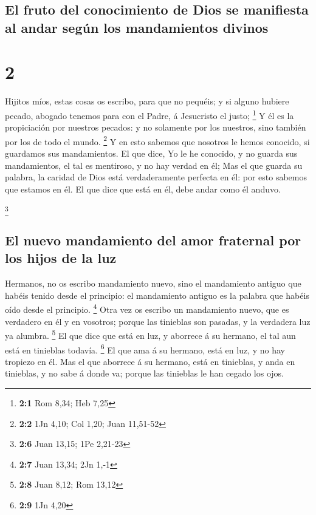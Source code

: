 \hypertarget{el-fruto-del-conocimiento-de-dios-se-manifiesta-al-andar-seguxfan-los-mandamientos-divinos}{%
\subsection{El fruto del conocimiento de Dios se manifiesta al andar
según los mandamientos
divinos}\label{el-fruto-del-conocimiento-de-dios-se-manifiesta-al-andar-seguxfan-los-mandamientos-divinos}}

\hypertarget{section-1}{%
\section{2}\label{section-1}}

 Hijitos míos, estas cosas os escribo, para que no pequéis;
y si alguno hubiere pecado, abogado tenemos para con el Padre, á
Jesucristo el justo; \footnote{\textbf{2:1} Rom 8,34; Heb 7,25}
 Y él es la propiciación por nuestros pecados: y no
solamente por los nuestros, sino también por los de todo el mundo.
\footnote{\textbf{2:2} 1Jn 4,10; Col 1,20; Juan 11,51-52}  Y
en esto sabemos que nosotros le hemos conocido, si guardamos sus
mandamientos.  El que dice, Yo le he conocido, y no guarda
sus mandamientos, el tal es mentiroso, y no hay verdad en él;
 Mas el que guarda su palabra, la caridad de Dios está
verdaderamente perfecta en él: por esto sabemos que estamos en él.
 El que dice que está en él, debe andar como él anduvo.

\footnote{\textbf{2:6} Juan 13,15; 1Pe 2,21-23}

\hypertarget{el-nuevo-mandamiento-del-amor-fraternal-por-los-hijos-de-la-luz}{%
\subsection{El nuevo mandamiento del amor fraternal por los hijos de la
luz}\label{el-nuevo-mandamiento-del-amor-fraternal-por-los-hijos-de-la-luz}}

 Hermanos, no os escribo mandamiento nuevo, sino el
mandamiento antiguo que habéis tenido desde el principio: el mandamiento
antiguo es la palabra que habéis oído desde el principio. \footnote{\textbf{2:7}
  Juan 13,34; 2Jn 1,-1}  Otra vez os escribo un mandamiento
nuevo, que es verdadero en él y en vosotros; porque las tinieblas son
pasadas, y la verdadera luz ya alumbra. \footnote{\textbf{2:8} Juan
  8,12; Rom 13,12}  El que dice que está en luz, y aborrece
á su hermano, el tal aun está en tinieblas todavía. \footnote{\textbf{2:9}
  1Jn 4,20}  El que ama á su hermano, está en luz, y no hay
tropiezo en él.  Mas el que aborrece á su hermano, está en
tinieblas, y anda en tinieblas, y no sabe á donde va; porque las
tinieblas le han cegado los ojos.

